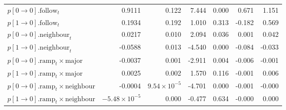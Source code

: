 \documentclass{article}
\begin{document}
\begin{table}[htbp]
\begin{tabular}{lrrrrrr}
$p[0 \rightarrow 0].\text{follow}_t$ &   0.9111 & 0.122 &   7.444 & 0.000 &   0.671 &   1.151 \\
$p[1 \rightarrow 0].\text{follow}_t$ &   0.1934 & 0.192 &   1.010 & 0.313 &  -0.182 &   0.569 \\
$p[0 \rightarrow 0].\text{neighbour}_t$ &   0.0217 & 0.010 &   2.094 & 0.036 &   0.001 &   0.042 \\
$p[1 \rightarrow 0].\text{neighbour}_t$ &  -0.0588 & 0.013 &  -4.540 & 0.000 &  -0.084 &  -0.033 \\
$p[0 \rightarrow 0].\text{ramp}_t \times \text{major}$ &  -0.0037 & 0.001 &  -2.911 & 0.004 &  -0.006 &  -0.001 \\
$p[1 \rightarrow 0].\text{ramp}_t \times \text{major}$ &   0.0025 & 0.002 &   1.570 & 0.116 &  -0.001 &   0.006 \\
$p[0 \rightarrow 0].\text{ramp}_t \times \text{neighbour}$ &  -0.0004 & $9.54 \times 10^{-5}$  &  -4.701 & 0.000 &  -0.001 &  -0.000 \\
$p[1 \rightarrow 0].\text{ramp}_t \times \text{neighbour}$ & $-5.48 \times 10^{-5}$ & 0.000 &  -0.477 & 0.634 &  -0.000 &   0.000 \\
\bottomrule
\end{tabular}
\end{table}
\end{document}
